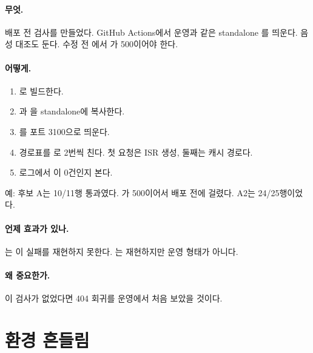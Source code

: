\paragraph{무엇.}
배포 전 검사를 만들었다. GitHub Actions에서 운영과 같은 standalone 를 띄운다.
음성 대조도 둔다. 수정 전 에서 가 500이어야 한다.

\paragraph{어떻게.}
\begin{enumerate}[nosep]
  \item {}로 빌드한다.
  \item {}과 을 standalone에 복사한다.
  \item {}를 포트 3100으로 띄운다.
  \item 경로표를 로 2번씩 친다. 첫 요청은 ISR 생성, 둘째는 캐시 경로다.
  \item 로그에서 이 0건인지 본다.
\end{enumerate}
예: 후보 A는 10/11행 통과였다. 가 500이어서 배포 전에 걸렸다. A2는 24/25행이었다.

\paragraph{언제 효과가 있나.}
는 이 실패를 재현하지 못한다. 는 재현하지만 운영 형태가 아니다.

\paragraph{왜 중요한가.}
이 검사가 없었다면 404 회귀를 운영에서 처음 보았을 것이다.

\section{환경 흔들림}\label{sec:le-drift}

